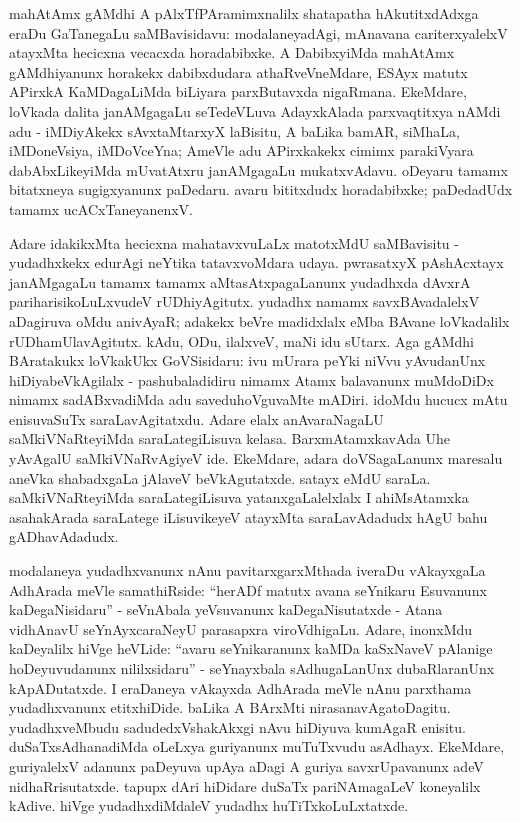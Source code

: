 mahAtAmx gAMdhi A pAlxTfPAramimxnalilx shatapatha hAkutitxdAdxga eraDu GaTanegaLu saMBavisidavu: modalaneyadAgi, mAnavana cariterxyalelxV atayxMta hecicxna vecacxda horadabibxke. A DabibxyiMda mahAtAmx gAMdhiyanunx horakekx dabibxdudara athaRveVneMdare, ESAyx matutx APirxkA KaMDagaLiMda biLiyara parxButavxda nigaRmana. EkeMdare, loVkada dalita janAMgagaLu seTedeVLuva AdayxkAlada parxvaqtitxya nAMdi adu - iMDiyAkekx sAvxtaMtarxyX laBisitu, A baLika bamAR, siMhaLa, iMDoneVsiya, iMDoVceYna; AmeVle adu APirxkakekx cimimx parakiVyara dabAbxLikeyiMda mUvatAtxru janAMgagaLu mukatxvAdavu. oDeyaru tamamx bitatxneya sugigxyanunx paDedaru. avaru bititxdudx horadabibxke; paDedadUdx tamamx ucACxTaneyanenxV.

Adare idakikxMta hecicxna mahatavxvuLaLx matotxMdU saMBavisitu - yudadhxkekx edurAgi neYtika tatavxvoMdara udaya. pwrasatxyX pAshAcxtayx janAMgagaLu tamamx tamamx aMtasAtxpagaLanunx yudadhxda dAvxrA pariharisikoLuLxvudeV rUDhiyAgitutx. yudadhx namamx savxBAvadalelxV aDagiruva oMdu anivAyaR; adakekx beVre madidxlalx eMba BAvane loVkadalilx rUDhamUlavAgitutx. kAdu, ODu, ilalxveV, maNi idu sUtarx. Aga gAMdhi BAratakukx loVkakUkx GoVSisidaru: ivu mUrara peYki niVvu yAvudanUnx hiDiyabeVkAgilalx - pashubaladidiru nimamx Atamx balavanunx muMdoDiDx nimamx sadABxvadiMda adu saveduhoVguvaMte mADiri. idoMdu hucucx mAtu enisuvaSuTx saraLavAgitatxdu. Adare elalx anAvaraNagaLU saMkiVNaRteyiMda saraLategiLisuva kelasa. BarxmAtamxkavAda Uhe yAvAgalU saMkiVNaRvAgiyeV ide. EkeMdare, adara doVSagaLanunx maresalu aneVka shabadxgaLa jAlaveV beVkAgutatxde. satayx eMdU saraLa. saMkiVNaRteyiMda saraLategiLisuva yatanxgaLalelxlalx I ahiMsAtamxka asahakArada saraLatege iLisuvikeyeV atayxMta saraLavAdadudx hAgU bahu gADhavAdadudx. 

modalaneya yudadhxvanunx nAnu pavitarxgarxMthada iveraDu vAkayxgaLa AdhArada meVle samathiRside: ``herADf matutx avana seYnikaru Esuvanunx kaDegaNisidaru'' - seVnAbala yeVsuvanunx kaDegaNisutatxde - Atana vidhAnavU seYnAyxcaraNeyU parasapxra viroVdhigaLu. Adare, inonxMdu kaDeyalilx hiVge heVLide: ``avaru seYnikaranunx kaMDa kaSxNaveV pAlanige hoDeyuvudanunx nililxsidaru'' - seYnayxbala sAdhugaLanUnx dubaRlaranUnx kApADutatxde. I eraDaneya vAkayxda AdhArada meVle nAnu parxthama yudadhxvanunx etitxhiDide. baLika A BArxMti nirasanavAgatoDagitu. yudadhxveMbudu sadudedxVshakAkxgi nAvu hiDiyuva kumAgaR enisitu. duSaTxsAdhanadiMda oLeLxya guriyanunx muTuTxvudu asAdhayx. EkeMdare, guriyalelxV adanunx paDeyuva upAya aDagi A guriya savxrUpavanunx adeV nidhaRrisutatxde. tapupx dAri hiDidare duSaTx pariNAmagaLeV koneyalilx kAdive. hiVge yudadhxdiMdaleV yudadhx huTiTxkoLuLxtatxde.

